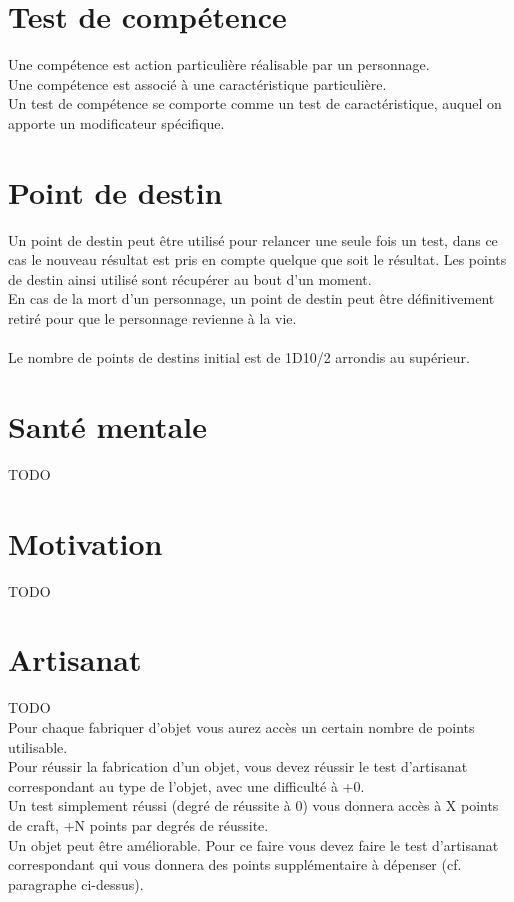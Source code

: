 \section{Test de compétence}
Une compétence est action particulière réalisable par un personnage. \\
Une compétence est associé à une caractéristique particulière. \\
Un test de compétence se comporte comme un test de caractéristique, auquel on apporte un modificateur spécifique.

\section{Point de destin}

Un point de destin peut être utilisé pour relancer une seule fois un test, dans ce cas le nouveau résultat est pris en compte quelque que soit le résultat. Les points de destin ainsi utilisé sont récupérer au bout d'un moment. \\
En cas de la mort d'un personnage, un point de destin peut être  définitivement retiré pour que le personnage revienne à la vie. \\ \\
Le nombre de points de destins initial est de 1D10/2 arrondis au supérieur.



\section{Santé mentale}
TODO
\section{Motivation}
TODO
\section{Artisanat}
TODO \\
Pour chaque fabriquer d'objet vous aurez accès un certain nombre de points utilisable. \\
Pour réussir la fabrication d'un objet, vous devez réussir le test d'artisanat correspondant au type de l'objet, avec une difficulté à +0. \\
Un test simplement réussi (degré de réussite à 0) vous donnera accès à X points de craft, +N points par degrés de réussite. \\
Un objet peut être améliorable. Pour ce faire vous devez faire le test d'artisanat correspondant qui vous donnera des points supplémentaire à dépenser (cf. paragraphe ci-dessus).
